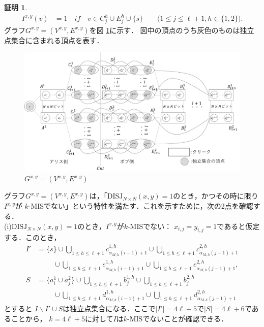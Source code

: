 \documentclass[12pt]{thesis}
\theoremstyle{definition}
\newtheorem*{prf*}{証明}
\begin{document}
\begin{prf*}
\begin{align*}
I^{x,y}(v) &= 1 \quad if \quad v \in C^{h}_{j} \cup E^{h}_{j} \cup \{s\} \quad \quad \text{($1\leq j \leq \ell+1, h \in \{1, 2\}$)}.
\end{align*}
グラフ$G^{x, y} = (V^{x,y}, E^{x,y})$を図 \ref{k_G(x,y)}に示す．
図中の頂点のうち灰色のものは独立点集合に含まれる頂点を表す．
\begin{figure}[ht]
\begin{center}
\includegraphics[width=120mm]{k_Gxy.png}
\end{center}
\caption{$G^{x, y} = (V^{x,y}, E^{x,y})$}
\label{k_G(x,y)}
\end{figure}
グラフ$G^{x, y} = (V^{x,y}, E^{x,y})$は，「$\mathrm{DISJ}_{N \times N} (x, y) = 1$のとき，かつその時に限り$I^{x,y}$が
$k$-MISでない」という特性を満たす．これを示すために，次の2点を確認する． \\
(i)$\mathrm{DISJ}_{N \times N} (x, y) = 1$のとき，$I^{x,y}$が$k$-MISでない：
$x_{i,j}=y_{i,j}=1$であると仮定する．このとき，
\begin{align*}
I' &= \{s\} \cup \bigcup_{1\leq h \leq \ell+1}c^{1,h}_{\alpha_{M,h}(i-1)+1} \cup 
\bigcup_{1\leq h \leq \ell+1}c^{2,h}_{\alpha_{M,h}(j-1)+1} \\
&\phantom{=} \quad \cup 
\bigcup_{1\leq h \leq \ell+1}e^{1,h}_{\alpha_{M,h}(i-1)+1} 
\cup \bigcup_{1\leq h \leq \ell+1}e^{2,h}_{\alpha_{M,h}(j-1)+1}, \\
S &= \{a^{1}_{i} \cup a^{2}_{j}\} \cup 
\bigcup_{1\leq h \leq \ell+1}b^{1,h}_{j} \cup 
\bigcup_{1\leq h \leq \ell+1}b^{2,h}_{j} \\
&\phantom{=} \quad \cup 
\bigcup_{1\leq h \leq \ell+1}d^{1,h}_{\alpha_{M,h}(i-1)+1} \cup  
\bigcup_{1\leq h \leq \ell+1}d^{2,h}_{\alpha_{M,h}(j-1)+1}
\end{align*}
とすると
$I \backslash I' \cup S$は独立点集合になる．ここで$|I'|=4\ell+5$で$|S|=4\ell+6$であることから，
$k=4\ell+5$に対して$I$は$k$-MISでないことが確認できる． \\

\end{prf*}
\end{document}
